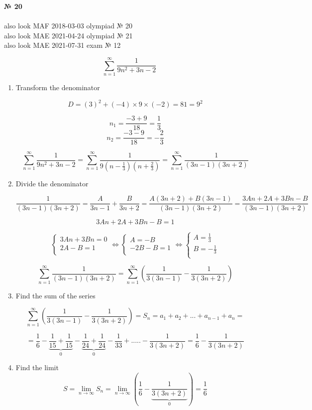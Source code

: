 \documentclass{article}
\begin{document}
\textbf{№ 20} 
\\
\\ also look MAF 2018-03-03 olympiad № 20
\\ also look MAE 2021-04-24 olympiad № 21
\\ also look MAE 2021-07-31 exam № 12

$$ \sum_{n=1}^{\infty} \frac{1}{9n^2+3n-2} $$

\begin{enumerate}

\item Transform the denominator

$$ D = (3)^2 + (-4)\times9\times(-2)=81=9^2 $$

$$ n_1 = \frac{-3+9}{18}=\frac{1}{3} $$
$$ n_2 = \frac{-3-9}{18}=-\frac{2}{3} $$

$$\sum_{n=1}^{\infty} \frac{1}{9n^2+3n-2} 
= \sum_{n=1}^{\infty} \frac{1}{9(n-\frac{1}{3})(n+\frac{2}{3})} 
= \sum_{n=1}^{\infty} \frac{1}{(3n-1)(3n+2)}$$

\item Divide the denominator

$$\frac{1}{(3n-1)(3n+2)} 
= \frac{A}{3n-1} + \frac{B}{3n+2} 
= \frac{A(3n+2)+B(3n-1)}{(3n-1)(3n+2)} 
= \frac{3An+2A+3Bn-B}{(3n-1)(3n+2)}$$

$$ 3An+2A+3Bn-B = 1 $$

$$
\left\{
  \begin{array}{ccc}
    3An + 3Bn = 0 \\
    2A-B = 1 \\
  \end{array}\Leftrightarrow
\right.
\left\{
  \begin{array}{ccc}
    A = -B \\
    -2B - B = 1 \\
  \end{array}\Leftrightarrow
\right.
\left\{
  \begin{array}{ccc}
    A = \frac{1}{3} \\
    B = -\frac{1}{3} \\
  \end{array}
\right.
$$

$$ \sum_{n=1}^{\infty} \frac{1}{(3n-1)(3n+2)} 
= \sum_{n=1}^{\infty} \left(\frac{1}{3(3n-1)} - \frac{1}{3(3n+2)}\right) $$

\item Find the sum of the series

$$ \sum_{n=1}^{\infty} \left(\frac{1}{3(3n-1)} - \frac{1}{3(3n+2)}\right) 
= S_n = a_1+a_2+...+a_{n-1}+a_n 
= $$

$$ = \frac{1}{6} - \underbrace{\frac{1}{15} + \frac{1}{15}}_{0} - \underbrace{\frac{1}{24} + \frac{1}{24}}_{0} - \frac{1}{33} + ..... - \frac{1}{3(3n+2)} 
= \frac{1}{6} - \frac{1}{3(3n+2)} $$

\item Find the limit
$$S = \lim_{n\to\infty} S_n 
= \lim_{n\to\infty} \left(\frac{1}{6} - \underbrace{\frac{1}{3(3n+2)}}_{0}\right) 
= \frac{1}{6} $$


\end{enumerate}
\end{document}
